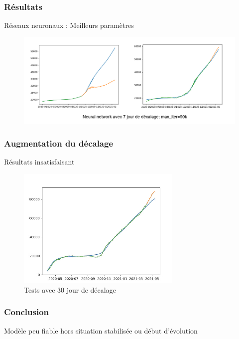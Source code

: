 \documentclass{beamer}
\begin{document}
\begin{frame}
	\frametitle{Résultats}
	Réseaux neuronaux : Meilleurs paramètres
	\begin{figure}
		\includegraphics[scale=0.6]{NN_3}
	\end{figure}
\end{frame}

\begin{frame}
	\frametitle{Augmentation du décalage}
	Résultats insatisfaisant 
	\begin{figure}
		\includegraphics[width=0.7\textwidth]{NN_2}
		\caption{Tests avec 30 jour de décalage}
	\end{figure}
\end{frame}

\begin{frame}
	\frametitle{Conclusion}
	Modèle peu fiable hors situation stabilisée ou début d'évolution
\end{frame}

\appendix
\end{document}
